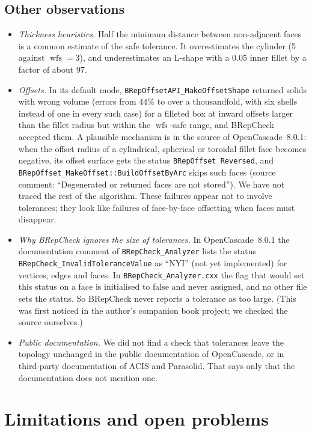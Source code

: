 \documentclass[preprint,12pt]{elsarticle}
\theoremstyle{definition}
\theoremstyle{remark}
\newcommand{\wfs}{\operatorname{wfs}}
\begin{document}
\subsection{Other observations}
\begin{itemize}
\item \emph{Thickness heuristics.} Half the minimum distance between non-adjacent faces is a common estimate of the
safe tolerance. It overestimates the cylinder (5 against $\wfs=3$), and underestimates an L-shape with a $0.05$
inner fillet by a factor of about $97$.
\item \emph{Offsets.} In its default mode, \texttt{BRepOffsetAPI\_MakeOffsetShape} returned solids with wrong
volume (errors from $44\%$ to over a thousandfold, with six shells instead of one in every such case) for a filleted box at
inward offsets larger than the fillet radius but within the $\wfs$-safe range, and BRepCheck accepted them. A plausible
mechanism is in the source of OpenCascade~8.0.1: when the offset radius of a cylindrical, spherical or toroidal fillet
face becomes negative, its offset
surface gets the status \texttt{BRepOffset\_Reversed}, and \texttt{BRepOffset\_MakeOffset::BuildOffsetByArc} skips
such faces (source comment: ``Degenerated or returned faces are not stored''). We have not traced the rest of the
algorithm. These failures appear not to involve tolerances; they look like failures of face-by-face offsetting when faces must
disappear.
\item \emph{Why BRepCheck ignores the size of tolerances.} In OpenCascade~8.0.1 the documentation comment of
\texttt{BRepCheck\_Analyzer} lists the status \texttt{BRepCheck\_InvalidToleranceValue} as ``NYI'' (not yet
implemented) for vertices, edges and faces. In \texttt{BRepCheck\_Analyzer.cxx} the flag that would set this status on a
face is initialised to false and never assigned, and no other file sets the status. So BRepCheck never reports a
tolerance as too large. (This was first noticed in the author's companion book project; we checked the source
ourselves.)
\item \emph{Public documentation.} We did not find a check that tolerances leave the topology unchanged in the
public documentation of OpenCascade, or in third-party documentation of ACIS and Parasolid. That says only that
the documentation does not mention one.
\end{itemize}

\section{Limitations and open problems}\label{sec:open}
\end{document}
